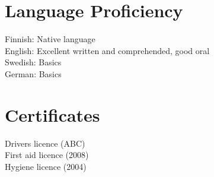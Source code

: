 \documentclass[margin,line]{resume}
\begin{document}
\begin{resume}
\pagebreak 
  
\section{\mysidestyle Language Proficiency}
Finnish: Native language \\ 
English: Excellent written and comprehended, good oral \\ 
Swedish: Basics \\ 
German: Basics 

\section{\mysidestyle Certificates} 
Drivers licence (ABC) \\
First aid licence (2008) \\
Hygiene licence (2004) \\

\end{resume}
\end{document}
